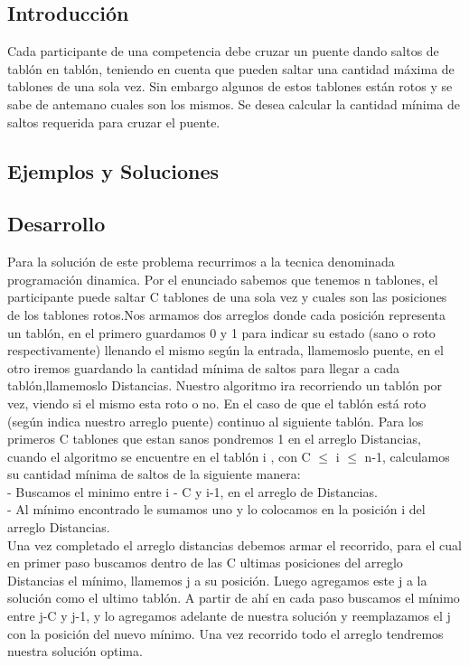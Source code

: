 \subsection{Introducci\'on} 
Cada participante de una competencia debe cruzar un puente dando saltos de tabl\'on en tabl\'on, teniendo en cuenta que pueden saltar una cantidad m\'axima de tablones de una sola vez. Sin embargo algunos de estos tablones est\'an rotos y se sabe de antemano cuales son los mismos. 
Se desea calcular la cantidad m\'inima de saltos requerida para cruzar el puente.

\subsection{Ejemplos y Soluciones}


\subsection{Desarrollo}
Para la soluci\'on de este problema recurrimos a la tecnica denominada programaci\'on dinamica. 
Por el enunciado sabemos que tenemos n tablones, el participante puede saltar C tablones de una sola vez y cuales son las posiciones de los tablones rotos.Nos armamos dos arreglos donde cada posici\'on representa un tabl\'on, en el primero guardamos 0 y 1 para indicar su estado (sano o roto respectivamente) llenando el mismo seg\'un la entrada, llamemoslo puente, en el otro iremos guardando la cantidad m\'inima de saltos para llegar a cada tabl\'on,llamemoslo Distancias.
Nuestro algoritmo ira recorriendo un tabl\'on por vez, viendo si el mismo esta roto o no. En el caso de que el tabl\'on est\'a roto (seg\'un indica nuestro arreglo puente) continuo al siguiente tabl\'on.
Para los primeros C tablones que estan sanos pondremos 1 en el arreglo Distancias, cuando el algoritmo se encuentre en el tabl\'on i , con C $\leq$ i $\leq $ n-1, calculamos su cantidad m\'inima de saltos de la siguiente manera:\\
- Buscamos el minimo entre i - C y i-1, en el arreglo de Distancias.\\
- Al m\'inimo encontrado le sumamos uno y lo colocamos en la posici\'on i del arreglo Distancias.\\
Una vez completado el arreglo distancias debemos armar el recorrido, para el cual en primer paso buscamos dentro de las C ultimas posiciones del arreglo Distancias el m\'inimo, llamemos j a su posici\'on. Luego agregamos este j a la soluci\'on como el ultimo tabl\'on.
A partir de ah\'i en cada paso buscamos el m\'inimo entre j-C y j-1, y lo agregamos adelante de nuestra soluci\'on y reemplazamos el j con la posici\'on del nuevo m\'inimo. Una vez recorrido todo el arreglo tendremos nuestra soluci\'on optima.
